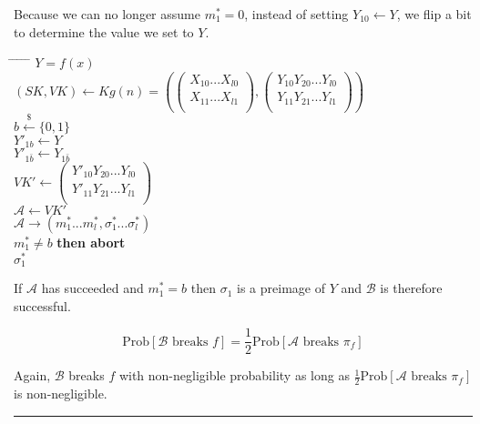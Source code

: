 \documentclass[twoside]{article}
\newenvironment{proof}{{\bf Proof:}}{\hfill\rule{2mm}{2mm}}
\begin{document}
\begin{proof}
Because we can no longer assume $m^*_1 = 0$, instead of setting $Y_{10} \leftarrow Y$, we flip a bit to determine the value we set to $Y$.

\begin{tabbing}
\hspace*{.25in} \= \hspace*{.25in} \= \hspace*{.25in} \= \hspace*{.25in} \= \hspace*{.25in} \=\kill
{} $Y = f(x)$\\
\>$(SK, VK) \leftarrow Kg(n) = \left(
\begin{pmatrix}
X_{10}...X_{l0}\\
X_{11}...X_{l1}\\
\end{pmatrix},
\begin{pmatrix}
Y_{10}Y_{20}...Y_{l0}\\
Y_{11}Y_{21}...Y_{l1}\\
\end{pmatrix}\right)$\\
\>$b \xleftarrow{\$} \{0,1\}$\\
\>$Y'_{1b} \leftarrow Y$\\
\>$Y'_{1\bar{b}} \leftarrow Y_{1\bar{b}}$\\
\>$VK' \leftarrow
\begin{pmatrix}
Y'_{10}Y_{20}...Y_{l0}\\
Y'_{11}Y_{21}...Y_{l1}\\
\end{pmatrix}$\\
\>$\mathcal{A} \leftarrow VK'$\\
\>$\mathcal{A} \rightarrow (m^*_1...m^*_l,\sigma^*_1...\sigma^*_l)$\\
 $m^*_1 \neq b$ {\bf then abort}\\
 $\sigma^*_1$
\end{tabbing}

If $\mathcal{A}$ has succeeded and $m^*_1 = b$ then $\sigma_1$ is a preimage of $Y$ and $\mathcal{B}$ is therefore successful.

$$\text{Prob}[\mathcal{B}\text{ breaks }f] = \frac{1}{2}\text{Prob}[\mathcal{A}\text{ breaks }\pi_f]$$

Again, $\mathcal{B}$ breaks $f$ with non-negligible probability as long as $\frac{1}{2}\text{Prob}[\mathcal{A}\text{ breaks }\pi_f]$ is non-negligible.
\end{proof}
\end{document}
